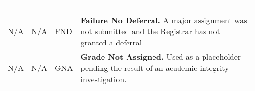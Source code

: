 \documentclass[12pt]{article}
\begin{document}
{\begin{tabular}{|l|l|l|l|}
& & & \\
& & & \\
& & & \\
\hline
\multirow{2}{*}{N/A} & \multirow{2}{*}{N/A} & \multirow{2}{*}{FND} & \multirow{2}{4in}{\textbf{Failure No Deferral.} A major assignment was not submitted and the Registrar has not granted a deferral.}\\
& & & \\
\hline
\multirow{2}{*}{N/A} & \multirow{2}{*}{N/A} & \multirow{2}{*}{GNA} & \multirow{2}{4in}{\textbf{Grade Not Assigned.} Used as a placeholder pending the result of an academic integrity investigation.}\\
& & & \\
\hline
\end{tabular}
}
\end{document}
